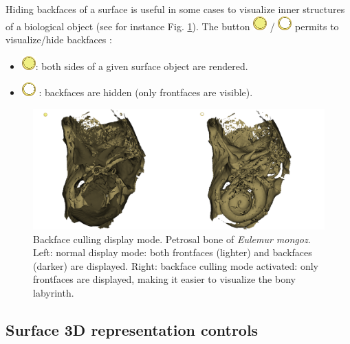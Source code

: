 Hiding backfaces of a surface is useful in some cases to visualize inner structures of a biological object (see for instance Fig. \ref{backface_example}). The button \includegraphics[scale=0.7]{images/06/display/backface_on.png} / \includegraphics[scale=0.7]{images/06/display/backface_off.png}  permits to visualize/hide backfaces :
\begin{itemize}
\item  \includegraphics[scale=0.7]{images/06/display/backface_on.png}: both sides of a given surface object are rendered.
\item	\includegraphics[scale=0.7]{images/06/display/backface_off.png} : backfaces are hidden (only frontfaces are visible).

\end{itemize}


\begin{figure}
  \centering
  \includegraphics[scale=0.3]{images/06/display/backface_example.png} 
	\caption{Backface culling display mode. Petrosal bone of \textit{Eulemur mongoz}. Left: normal display mode: both frontfaces (lighter) and backfaces (darker) are displayed. Right: backface culling mode activated: only frontfaces are displayed, making it easier to visualize the bony labyrinth. }
\label{backface_example}
 
\end{figure}



\subsection{Surface 3D representation controls}


